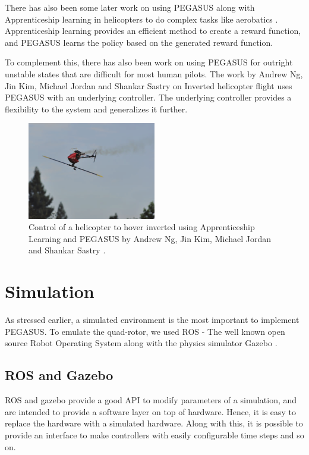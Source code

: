 \documentclass[hidelinks,BTech]{iitmdiss}
\begin{document}
There has also been some later work on using PEGASUS along with Apprenticeship learning in helicopters to do complex tasks like aerobatics \cite{ApprenticeshipHelicopterAerobatics}. Apprenticeship learning provides an efficient method to create a reward function, and PEGASUS learns the policy based on the generated reward function.

To complement this, there has also been work on using PEGASUS for outright unstable states that are difficult for most human pilots. The work by Andrew Ng, Jin Kim, Michael Jordan and Shankar Sastry on Inverted helicopter flight \cite{InvertedHelicopterFlight} uses PEGASUS with an underlying controller. The underlying controller provides a flexibility to the system and generalizes it further.

\begin{figure}[H]
  \centering
    \includegraphics[width=0.5\textwidth]{pegasus_inverted_helicopter.png}
    \caption{Control of a helicopter to hover inverted using Apprenticeship Learning and PEGASUS by Andrew Ng, Jin Kim, Michael Jordan and Shankar Sastry \cite{InvertedHelicopterFlight}.}
\end{figure}


\chapter{Simulation}

As stressed earlier, a simulated environment is the most important to implement PEGASUS. To emulate the quad-rotor, we used ROS \cite{ROS} - The well known open source Robot Operating System along with the physics simulator Gazebo \cite{Gazebo}.

\section{ROS and Gazebo}

ROS and gazebo provide a good API to modify parameters of a simulation, and are intended to provide a software layer on top of hardware. Hence, it is easy to replace the hardware with a simulated hardware. Along with this, it is possible to provide an interface to make controllers with easily configurable time steps and so on.
\end{document}
